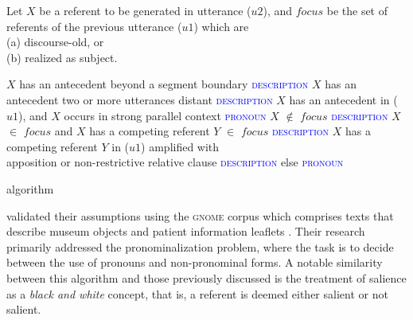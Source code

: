 \begin{algorithm}
	Let $X$ be a referent to be generated in utterance ($u2$), and $focus$ be the set of referents of the previous utterance ($u1$) which are\\
	\hspace{1cm}(a) discourse-old, or\\
	\hspace{1cm}(b) realized as subject. \;
	
	$X$ has an antecedent beyond a segment boundary \hspace{1.5cm} \textcolor{blue}{\textsc{description}}\;
	$X$ has an antecedent two or more utterances distant \hspace{1.185cm} \textcolor{blue}{\textsc{description}} \;
	$X$ has an antecedent in ($u1$), and \;
	\hspace{1cm}$X$ occurs in strong parallel context \hspace{3cm} \textcolor{blue}{\textsc{pronoun}}\;
	\hspace{1cm} $X$ $\notin$ $focus$ \hspace{6.6cm} \textcolor{blue}{\textsc{description}} \;
	\hspace{1cm} $X$ $\in$ $focus$ and \;
	\hspace{2cm} $X$ has a competing referent $Y$ $\in$ $focus$ \hspace{1.2cm} \textcolor{blue}{\textsc{description}} \;
	\hspace{2cm} $X$ has a competing referent $Y$ in ($u1$) amplified with\\ \hspace{2cm} apposition or non-restrictive relative clause\hspace{0.4cm} \textcolor{blue}{\textsc{description}} \;
	\hspace{2cm} else \hspace{6.85cm} \textcolor{blue}{\textsc{pronoun}} \;
	
	\caption{ algorithm}
	\label{algo:b}
\end{algorithm}

\citet{henschel2000pronominalization} validated their assumptions using the \textsc{gnome} corpus which comprises texts that describe museum objects and patient information leaflets \citep{poesio2004discourse, poesio2004centering, di1997learning}.
Their research primarily addressed the pronominalization problem, where the task is to decide between the use of pronouns and non-pronominal forms. A notable similarity between this algorithm and those previously discussed is the treatment of salience as a \textit{black and white} concept, that is, a referent is deemed either salient or not salient.


